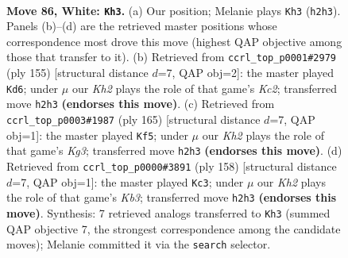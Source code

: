 \documentclass[11pt]{article}
\begin{document}
\clearpage

\begin{figure}[p]\centering
\begin{subfigure}{0.46\textwidth}\centering
\resizebox{\linewidth}{!}{%
\newchessgame
\chessboard[
  setfen={5r1k/P7/3R4/8/8/8/7K/8 w - - 41 86},
  showmover=false,
  pgfstyle=straightmove, color=movearrow, markmove={h2-h3}
]}
\caption{}
\end{subfigure}\hfill
\begin{subfigure}{0.46\textwidth}\centering
\resizebox{\linewidth}{!}{%
\newchessgame
\chessboard[
  setfen={8/2k5/4r3/5R1K/6p1/6P1/8/8 b - - 0 78},
  showmover=false,
  pgfstyle=straightmove, color=movearrow, markmove={c7-d6}
]}
\caption{}
\end{subfigure}
\\[4pt]
\begin{subfigure}{0.46\textwidth}\centering
\resizebox{\linewidth}{!}{%
\newchessgame
\chessboard[
  setfen={8/2KP4/6k1/8/3r4/8/7p/2R5 b - - 1 83},
  showmover=false,
  pgfstyle=straightmove, color=movearrow, markmove={g6-f5}
]}
\caption{}
\end{subfigure}\hfill
\begin{subfigure}{0.46\textwidth}\centering
\resizebox{\linewidth}{!}{%
\newchessgame
\chessboard[
  setfen={2R5/7r/7k/5p2/8/1K4P1/8/8 w - - 7 80},
  showmover=false,
  pgfstyle=straightmove, color=movearrow, markmove={b3-c3}
]}
\caption{}
\end{subfigure}
\caption{\textbf{Move 86, White: \texttt{Kh3}.} (a) Our position; Melanie plays \texttt{Kh3} (\texttt{h2h3}). Panels (b)--(d) are the retrieved master positions whose correspondence most drove this move (highest QAP objective among those that transfer to it). (b) Retrieved from \texttt{ccrl\_top\_p0001\#2979} (ply 155) [structural distance $d$=7, QAP obj=2]: the master played \texttt{Kd6}; under $\mu$ our \emph{Kh2} plays the role of that game's \emph{Kc2}; transferred move \texttt{h2h3} \textbf{(endorses this move)}. (c) Retrieved from \texttt{ccrl\_top\_p0003\#1987} (ply 165) [structural distance $d$=7, QAP obj=1]: the master played \texttt{Kf5}; under $\mu$ our \emph{Kh2} plays the role of that game's \emph{Kg3}; transferred move \texttt{h2h3} \textbf{(endorses this move)}. (d) Retrieved from \texttt{ccrl\_top\_p0000\#3891} (ply 158) [structural distance $d$=7, QAP obj=1]: the master played \texttt{Kc3}; under $\mu$ our \emph{Kh2} plays the role of that game's \emph{Kb3}; transferred move \texttt{h2h3} \textbf{(endorses this move)}. Synthesis: 7 retrieved analogs transferred to \texttt{Kh3} (summed QAP objective 7, the strongest correspondence among the candidate moves); Melanie committed it via the \texttt{search} selector.}
\label{fig:thought-m170}
\end{figure}
\end{document}
